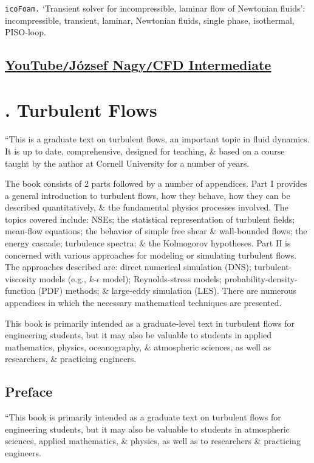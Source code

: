 \documentclass[oneside]{book}
\numberwithin{equation}{section}
\begin{document}
\texttt{icoFoam.} `Transient solver for incompressible, laminar flow of Newtonian fluids': incompressible, transient, laminar, Newtonian fluids, single phase, isothermal, PISO-loop.

\section{\href{https://www.youtube.com/playlist?list=PLcOe4WUSsMkGPdwCpZfKcpn7w-EkgAMB8}{YouTube\texttt{/}J\'ozsef Nagy\texttt{/}CFD Intermediate}}


\chapter{\cite{Pope2000}. Turbulent Flows}

``This is a graduate text on turbulent flows, an important topic in fluid dynamics. It is up to date, comprehensive, designed for teaching, \& based on a course taught by the author at Cornell University for a number of years.

The book consists of 2 parts followed by a number of appendices. Part I provides a general introduction to turbulent flows, how they behave, how they can be described quantitatively, \& the fundamental physics processes involved. The topics covered include: NSEs; the statistical representation of turbulent fields; mean-flow equations; the behavior of simple free shear \& wall-bounded flows; the energy cascade; turbulence spectra; \& the Kolmogorov hypotheses. Part II is concerned with various approaches for modeling or simulating turbulent flows. The approaches described are: direct numerical simulation (DNS); turbulent-viscosity models (e.g., $k$-$\epsilon$ model); Reynolds-stress models; probability-density-function (PDF) methods; \& large-eddy simulation (LES). There are numerous appendices in which the necessary mathematical techniques are presented.

This book is primarily intended as a graduate-level text in turbulent flows for engineering students, but it may also be valuable to students in applied mathematics, physics, oceanography, \& atmospheric sciences, as well as researchers, \& practicing engineers.

\section*{Preface}
``This book is primarily intended as a graduate text on turbulent flows for engineering students, but it may also be valuable to students in atmospheric sciences, applied mathematics, \& physics, as well as to researchers \& practicing engineers.
\end{document}
